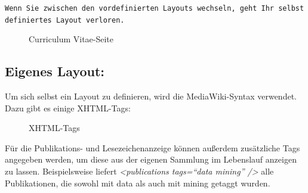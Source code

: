 \begin{mdframed}[style=tipp]\texttt{Wenn Sie zwischen den vordefinierten Layouts wechseln, geht Ihr selbst definiertes Layout verloren.} \
\end{mdframed}
\begin{figure}[h!]
 \centering
 \caption{Curriculum Vitae-Seite}
 \label{fig:curriculumVitaeSeite}
\end{figure}
\subsection{Eigenes Layout:}
\label{subsec:eigenesLayout}
Um sich selbst ein Layout zu definieren, wird die MediaWiki-Syntax verwendet. Dazu gibt es einige XHTML-Tags:
\begin{figure}[h!]
 \centering
 \caption{XHTML-Tags}
 \label{fig:xhtmlTags}
\end{figure} %
\newline
Für die Publikations- und Lesezeichenanzeige können außerdem zusätzliche Tags angegeben werden, um diese aus der eigenen Sammlung im Lebenslauf anzeigen zu lassen. Beispielsweise liefert \textit{<publications tags=\enquote{data mining} />} alle Publikationen, die sowohl mit data als auch mit mining getaggt wurden.  
